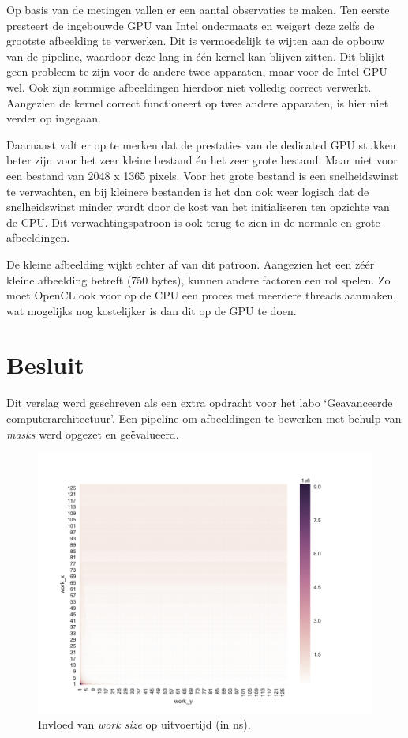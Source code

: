 \documentclass[twocolumn, a4paper]{article}
\begin{document}
Op basis van de metingen vallen er een aantal observaties te maken. Ten eerste presteert de ingebouwde GPU van Intel ondermaats en weigert deze zelfs de grootste afbeelding te verwerken. Dit is vermoedelijk te wijten aan de opbouw van de pipeline, waardoor deze lang in één kernel kan blijven zitten. Dit blijkt geen probleem te zijn voor de andere twee apparaten, maar voor de Intel GPU wel. Ook zijn sommige afbeeldingen hierdoor niet volledig correct verwerkt. Aangezien de kernel correct functioneert op twee andere apparaten, is hier niet verder op ingegaan.

Daarnaast valt er op te merken dat de prestaties van de dedicated GPU stukken beter zijn voor het zeer kleine bestand én het zeer grote bestand. Maar niet voor een bestand van 2048 x 1365 pixels. Voor het grote bestand is een snelheidswinst te verwachten, en bij kleinere bestanden is het dan ook weer logisch dat de snelheidswinst minder wordt door de kost van het initialiseren ten opzichte van de CPU. Dit verwachtingspatroon is ook terug te zien in de normale en grote afbeeldingen. 

De kleine afbeelding wijkt echter af van dit patroon. Aangezien het een zéér kleine afbeelding betreft (750 bytes), kunnen andere factoren een rol spelen. Zo moet OpenCL ook voor op de CPU een proces met meerdere threads aanmaken, wat mogelijks nog kostelijker is dan dit op de GPU te doen. 


\section{Besluit}
Dit verslag werd geschreven als een extra opdracht voor het labo `Geavanceerde computerarchitectuur'. Een pipeline om afbeeldingen te bewerken met behulp van \textit{masks} werd opgezet en ge\"evalueerd.

\begin{figure}
    \centering
    \includegraphics[width=1.1\textwidth]{data/output_powers.pdf}
    \caption{Invloed van \emph{work size} op uitvoertijd (in ns).}\label{fig:output-all}
\end{figure}

\onecolumn

\appendix




\newpage

\end{document}
